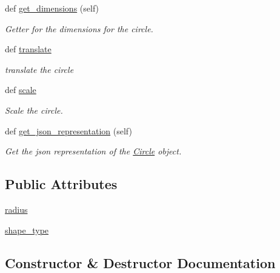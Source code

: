 \begin{DoxyCompactItemize}
def \hyperlink{classbridges_1_1circle_1_1_circle_a8b6af5d39ec48245f0244a7499082822}{get\+\_\+dimensions} (self)
\begin{DoxyCompactList}\small\item\em Getter for the dimensions for the circle. \end{DoxyCompactList}\item 
def \hyperlink{classbridges_1_1circle_1_1_circle_a45281756c505403dcee3bd5d0d04681f}{translate}
\begin{DoxyCompactList}\small\item\em translate the circle \end{DoxyCompactList}\item 
def \hyperlink{classbridges_1_1circle_1_1_circle_a85f41fd8adbaca617b96b5d656d8d6ff}{scale}
\begin{DoxyCompactList}\small\item\em Scale the circle. \end{DoxyCompactList}\item 
def \hyperlink{classbridges_1_1circle_1_1_circle_a7a1be40bcd6028dab0a5bcab6e69c355}{get\+\_\+json\+\_\+representation} (self)
\begin{DoxyCompactList}\small\item\em Get the json representation of the \hyperlink{classbridges_1_1circle_1_1_circle}{Circle} object. \end{DoxyCompactList}\end{DoxyCompactItemize}
\subsection*{Public Attributes}
\begin{DoxyCompactItemize}
\item 
\hyperlink{classbridges_1_1circle_1_1_circle_ab52ae32c28ea4175b815a7b04491205b}{radius}
\item 
\hyperlink{classbridges_1_1circle_1_1_circle_a34d318970485d12445ce43225b81428e}{shape\+\_\+type}
\end{DoxyCompactItemize}


\subsection{Constructor \& Destructor Documentation}
\mbox{\label{classbridges_1_1circle_1_1_circle_a04dfb68bb632534cf715e2ce927cc76a}} 

